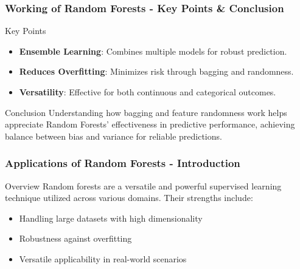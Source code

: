 \documentclass[aspectratio=169]{beamer}
\begin{document}
\begin{frame}[fragile]
    \frametitle{Working of Random Forests - Key Points & Conclusion}
    \begin{block}{Key Points}
        \begin{itemize}
            \item \textbf{Ensemble Learning}: Combines multiple models for robust prediction.
            \item \textbf{Reduces Overfitting}: Minimizes risk through bagging and randomness.
            \item \textbf{Versatility}: Effective for both continuous and categorical outcomes.
        \end{itemize}
    \end{block}

    \begin{block}{Conclusion}
        Understanding how bagging and feature randomness work helps appreciate Random Forests' effectiveness in predictive performance, achieving balance between bias and variance for reliable predictions.
    \end{block}
\end{frame}

\begin{frame}[fragile]
    \frametitle{Applications of Random Forests - Introduction}
    \begin{block}{Overview}
        Random forests are a versatile and powerful supervised learning technique utilized across various domains. 
        Their strengths include:
    \end{block}
    \begin{itemize}
        \item Handling large datasets with high dimensionality
        \item Robustness against overfitting
        \item Versatile applicability in real-world scenarios
    \end{itemize}
\end{frame}
\end{document}
